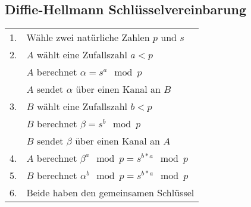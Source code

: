 \subsection{Diffie-Hellmann Schlüsselvereinbarung}
\begin{tabular}{ll}
    1. & Wähle zwei natürliche Zahlen $p$ und $s$ \\
    2. & $A$ wählt eine Zufallszahl $a < p$ \\
    & $A$ berechnet $\alpha = s^a \mod p$ \\
    & $A$ sendet $\alpha$ über einen Kanal an $B$ \\
    3. & $B$ wählt eine Zufallszahl $b < p$ \\
    & $B$ berechnet $\beta = s^b \mod p$ \\
    & $B$ sendet $\beta$ über einen Kanal an $A$ \\
    4. & $A$ berechnet $\beta ^a \mod p = s^{b*a} \mod p$ \\
    5. & $B$ berechnet $\alpha ^b \mod p = s^{b*a} \mod p$ \\
    6. & Beide haben den gemeinsamen Schlüssel  \\
\end{tabular} \\

